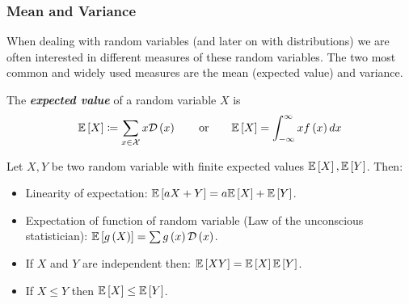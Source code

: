 \subsubsection{Mean and Variance}
When dealing with random variables (and later on with distributions) we are often interested in different measures of these random variables. The two most common and widely used measures are the mean (expected value) and variance.

\begin{definition}
The \textbf{\textit{expected value}} of a random variable $X$ is
$$ \mathbb{E}  \left[X\right]\coloneqq\sum_{x\in\mathcal{X}}x\mathcal{D}\left(x\right)\qquad\mbox{or}\qquad \mathbb{E} \left[X\right]=\int_{-\infty}^{\infty}xf\left(x\right)dx	$$
\end{definition}

\begin{claim}
Let $X,Y$ be two random variable with finite expected values $\mathbb{E}\left[X\right],\mathbb{E}\left[Y\right]$. Then:
\begin{itemize}
	\item Linearity of expectation: $\mathbb{E} \left[aX+Y\right]=a\mathbb{E} \left[X\right]+\mathbb{E} \left[Y\right]$.
	\item Expectation of function of random variable (Law of the unconscious statistician): $\mathbb{E} \left[g\left(X\right)\right]=\sum g\left(x\right)\mathcal{D}\left(x\right)$.
	\item If $X$ and $Y$ are independent then:  $\mathbb{E} \left[XY\right]=\mathbb{E} \left[X\right]\mathbb{E} \left[Y\right]$.
	\item If $X\leq Y$ then $\mathbb{E}\left[X\right]\leq \mathbb{E}\left[Y\right]$.
\end{itemize}
\end{claim}

